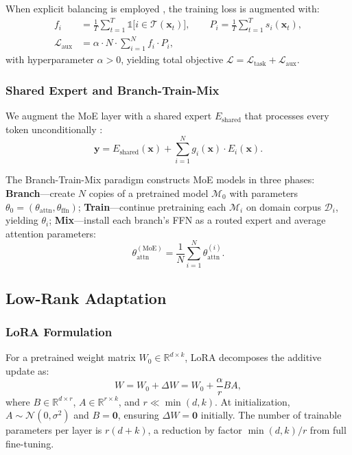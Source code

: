 \documentclass[11pt,a4paper]{article}
\newcommand{\R}{\mathbb{R}}
\begin{document}
When explicit balancing is employed \citep{shazeer2017outrageously, fedus2022switch}, the training loss is augmented with:
\begin{align}
    f_i &= \frac{1}{T} \sum_{t=1}^{T} \mathbb{1}\bigl[i \in \mathcal{T}(\mathbf{x}_t)\bigr], \qquad
    P_i = \frac{1}{T} \sum_{t=1}^{T} s_i(\mathbf{x}_t), \\
    \mathcal{L}_{\mathrm{aux}} &= \alpha \cdot N \cdot \sum_{i=1}^{N} f_i \cdot P_i,
\end{align}
with hyperparameter $\alpha > 0$, yielding total objective $\mathcal{L} = \mathcal{L}_{\mathrm{task}} + \mathcal{L}_{\mathrm{aux}}$.

\subsubsection{Shared Expert and Branch-Train-Mix}

We augment the MoE layer with a shared expert $E_{\mathrm{shared}}$ that processes every token unconditionally \citep{deepseekai2024deepseekv3}:
\begin{equation}\label{eq:shared_expert}
    \mathbf{y} = E_{\mathrm{shared}}(\mathbf{x}) + \sum_{i=1}^{N} g_i(\mathbf{x}) \cdot E_i(\mathbf{x}).
\end{equation}

The Branch-Train-Mix paradigm \citep{sukhbaatar2024branch} constructs MoE models in three phases: \textbf{Branch}---create $N$ copies of a pretrained model $\mathcal{M}_0$ with parameters $\theta_0 = (\theta_{\mathrm{attn}}, \theta_{\mathrm{ffn}})$; \textbf{Train}---continue pretraining each $\mathcal{M}_i$ on domain corpus $\mathcal{D}_i$, yielding $\theta_i$; \textbf{Mix}---install each branch's FFN as a routed expert and average attention parameters:
\begin{equation}\label{eq:btm_attn}
    \theta_{\mathrm{attn}}^{(\mathrm{MoE})} = \frac{1}{N} \sum_{i=1}^{N} \theta_{\mathrm{attn}}^{(i)}.
\end{equation}

\subsection{Low-Rank Adaptation}

\subsubsection{LoRA Formulation}

For a pretrained weight matrix $W_0 \in \R^{d \times k}$, LoRA \citep{hu2022lora} decomposes the additive update as:
\begin{equation}\label{eq:lora}
    W = W_0 + \Delta W = W_0 + \frac{\alpha}{r} B A,
\end{equation}
where $B \in \R^{d \times r}$, $A \in \R^{r \times k}$, and $r \ll \min(d, k)$. At initialization, $A \sim \mathcal{N}(0, \sigma^2)$ and $B = \mathbf{0}$, ensuring $\Delta W = \mathbf{0}$ initially. The number of trainable parameters per layer is $r(d + k)$, a reduction by factor $\min(d, k)/r$ from full fine-tuning.
\end{document}
